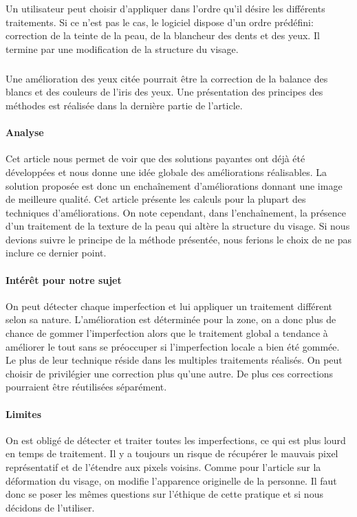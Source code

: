 \documentclass[11pt, french]{report-rd-info}
\begin{document}
Un utilisateur peut choisir d’appliquer dans l’ordre qu’il désire les différents traitements. Si ce n’est pas le cas, le logiciel dispose d’un ordre prédéfini: correction de la teinte de la peau, de la blancheur des dents et des yeux. Il termine par une modification de la structure du visage.
\subparagraph{}
Une amélioration des yeux citée pourrait être la correction de la balance des blancs et des couleurs de l’iris des yeux. Une présentation des principes des méthodes est réalisée dans la dernière partie de l’article.
\paragraph{Analyse}
Cet article nous permet de voir que des solutions payantes ont déjà été développées et nous donne une idée globale des améliorations réalisables. La solution proposée est donc un enchaînement d’améliorations donnant une image de meilleure qualité. Cet article présente les calculs pour la plupart des techniques d’améliorations. On note cependant, dans l'enchaînement, la présence d’un traitement de la texture de la peau qui altère la structure du visage. Si nous devions suivre le principe de la méthode présentée, nous ferions le choix de ne pas inclure ce dernier point.
\paragraph{Intérêt pour notre sujet}
On peut détecter chaque imperfection et lui appliquer un traitement différent selon sa nature. L’amélioration est déterminée pour la zone, on a donc plus de chance de gommer l’imperfection alors que le traitement global a tendance à améliorer le tout sans se préoccuper si l’imperfection locale a bien été gommée. Le plus de leur technique réside dans les multiples traitements réalisés. On peut choisir de privilégier une correction plus qu’une autre. De plus ces corrections pourraient être réutilisées séparément.
\paragraph{Limites}
On est obligé de détecter et traiter toutes les imperfections, ce qui est plus lourd en temps de traitement.
Il y a toujours un risque de récupérer le mauvais pixel représentatif et de l’étendre aux pixels voisins.
Comme pour l’article sur la déformation du visage, on modifie l’apparence originelle de la personne. Il faut donc se poser les mêmes questions sur l’éthique de cette pratique et si nous décidons de l’utiliser.
\end{document}
